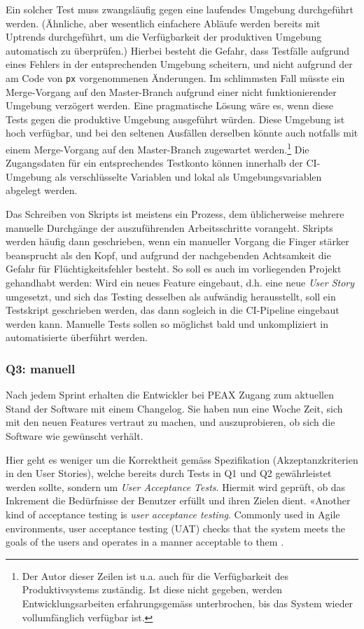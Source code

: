 Ein solcher Test muss zwangsläufig gegen eine laufendes Umgebung durchgeführt werden. (Ähnliche, aber wesentlich einfachere Abläufe werden bereits mit Uptrends durchgeführt, um die Verfügbarkeit der produktiven Umgebung automatisch zu überprüfen.) Hierbei besteht die Gefahr, dass Testfälle aufgrund eines Fehlers in der entsprechenden Umgebung scheitern, und nicht aufgrund der am Code von \texttt{px} vorgenommenen Änderungen. Im schlimmsten Fall müsste ein Merge-Vorgang auf den Master-Branch aufgrund einer nicht funktionierender Umgebung verzögert werden. Eine pragmatische Lösung wäre es, wenn diese Tests gegen die produktive Umgebung ausgeführt würden. Diese Umgebung ist hoch verfügbar, und bei den seltenen Ausfällen derselben könnte auch notfalls mit einem Merge-Vorgang auf den Master-Branch zugewartet werden.\footnote{Der Autor dieser Zeilen ist u.a. auch für die Verfügbarkeit des Produktivsystems zuständig. Ist diese nicht gegeben, werden Entwicklungsarbeiten erfahrungsgemäss unterbrochen, bis das System wieder vollumfänglich verfügbar ist.} Die Zugangsdaten für ein entsprechendes Testkonto können innerhalb der CI-Umgebung als verschlüsselte Variablen und lokal als Umgebungsvariablen abgelegt werden.

Das Schreiben von Skripts ist meistens ein Prozess, dem üblicherweise mehrere manuelle Durchgänge der auszuführenden Arbeitsschritte vorangeht. Skripts werden häufig dann geschrieben, wenn ein manueller Vorgang die Finger stärker beansprucht als den Kopf, und aufgrund der nachgebenden Achtsamkeit die Gefahr für Flüchtigkeitsfehler besteht. So soll es auch im vorliegenden Projekt gehandhabt werden: Wird ein neues Feature eingebaut, d.h. eine neue \textit{User Story} umgesetzt, und sich das Testing desselben als aufwändig herausstellt, soll ein Testskript geschrieben werden, das dann sogleich in die CI-Pipeline eingebaut werden kann. Manuelle Tests sollen so möglichst bald und unkompliziert in automatisierte überführt werden.

\subsubsection{Q3: manuell}

Nach jedem Sprint erhalten die Entwickler bei PEAX Zugang zum aktuellen Stand der Software mit einem Changelog. Sie haben nun eine Woche Zeit, sich mit den neuen Features vertraut zu machen, und auszuprobieren, ob sich die Software wie gewünscht verhält.

Hier geht es weniger um die Korrektheit gemäss Spezifikation (Akzeptanzkriterien in den User Stories), welche bereits durch Tests in Q1 und Q2 gewährleistet werden sollte, sondern um \textit{User Acceptance Tests}. Hiermit wird geprüft, ob das Inkrement die Bedürfnisse der Benutzer erfüllt und ihren Zielen dient. «Another kind of acceptance testing is \textit{user acceptance testing}. Commonly used in Agile environments, user acceptance testing (UAT) checks that the system meets the goals of the users and operates in a manner acceptable to them \cite[p. 85]{testing}.

